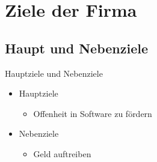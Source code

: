 \documentclass[11pt,aspectratio=169]{beamer}
\begin{document}
\section {Ziele der Firma}
\subsection {Haupt und Nebenziele}
\begin{frame}{Hauptziele und Nebenziele}
	\begin{itemize}
		\item <1-> Hauptziele
		      \begin{itemize}
			      \item<2->Offenheit in Software zu fördern\cite{Grundprinziepe}
		      \end{itemize}
	\end{itemize}
	\begin{itemize}
		\item <3-> Nebenziele
		      \begin{itemize}
			      \item<4->Geld auftreiben
		      \end{itemize}
	\end{itemize}
\end{frame}
\end{document}
